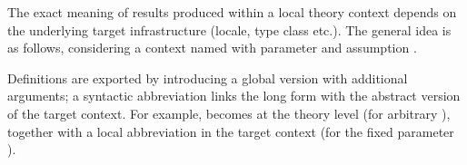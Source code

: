 \begin{isabellebody}
\begin{isamarkuptext}
\begin{descr}
  \end{descr}

  The exact meaning of results produced within a local theory context
  depends on the underlying target infrastructure (locale, type class
  etc.).  The general idea is as follows, considering a context named
   with parameter  and assumption .
  
  Definitions are exported by introducing a global version with
  additional arguments; a syntactic abbreviation links the long form
  with the abstract version of the target context.  For example,
   becomes  at the theory
  level (for arbitrary ), together with a local
  abbreviation  in the target context (for the
  fixed parameter ).


\end{isamarkuptext}
\end{isabellebody}
